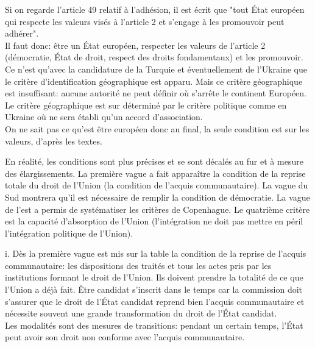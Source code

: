 \documentclass[12pt, a4paper, openany]{book}
\begin{document}
Si on regarde l'article 49 relatif à l'adhésion, il est écrit que "tout État européen qui respecte les valeurs visés à l'article 2 et s'engage à les promouvoir peut adhérer". \\
Il faut donc: être un État européen, respecter les valeurs de l'article 2 (démocratie, État de droit, respect des droits fondamentaux) et les promouvoir. \\
Ce n'est qu'avec la candidature de la Turquie et éventuellement de l'Ukraine que le critère d'identification géographique est apparu. Mais ce critère géographique est insuffisant: aucune autorité ne peut définir où s'arrête le continent Européen. Le critère géographique est sur déterminé par le critère politique comme en Ukraine où ne sera établi qu'un accord d'association. \\
On ne sait pas ce qu'est être européen donc au final, la seule condition est sur les valeurs, d'après les textes.


En réalité, les conditions sont plus précises et se sont décalés au fur et à mesure des élargissements. La première vague a fait apparaître la condition de la reprise totale du droit de l'Union (la condition de l'acquis communautaire). La vague du Sud montrera qu'il est nécessaire de remplir la condition de démocratie. La vague de l'est a permis de systématiser les critères de Copenhague. Le quatrième critère est la capacité d'absorption de l'Union (l'intégration ne doit pas mettre en péril l'intégration politique de l'Union).


i. Dès la première vague est mis sur la table la condition de la reprise de l'acquis communautaire: les dispositions des traités et tous les actes pris par les institutions formant le droit de l'Union. Ils doivent prendre la totalité de ce que l'Union a déjà fait. Être candidat s'inscrit dans le temps car la commission doit s'assurer que le droit de l'État candidat reprend bien l'acquis communautaire et nécessite souvent une grande transformation du droit de l'État candidat. \\
Les modalités sont des mesures de transitions: pendant un certain temps, l'État peut avoir son droit non conforme avec l'acquis communautaire. 
\end{document}
